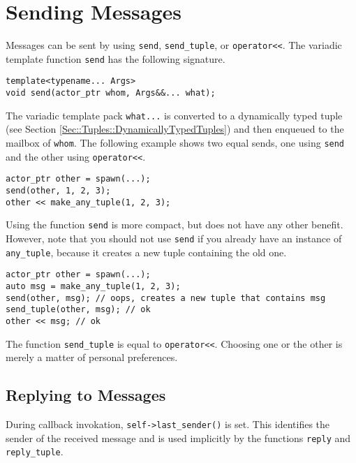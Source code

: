 \section{Sending Messages}
\label{Sec::Send}

Messages can be sent by using \lstinline^send^, \lstinline^send_tuple^, or \lstinline^operator<<^. The variadic template function \lstinline^send^ has the following signature.

\begin{lstlisting}
template<typename... Args>
void send(actor_ptr whom, Args&&... what);
\end{lstlisting}

The variadic template pack \lstinline^what...^ is converted to a dynamically typed tuple (see Section \ref{Sec::Tuples::DynamicallyTypedTuples}) and then enqueued to the mailbox of \lstinline^whom^.
The following example shows two equal sends, one using \lstinline^send^ and the other using \lstinline^operator<<^.

\begin{lstlisting}
actor_ptr other = spawn(...);
send(other, 1, 2, 3);
other << make_any_tuple(1, 2, 3);
\end{lstlisting}

Using the function \lstinline^send^ is more compact, but does not have any other benefit.
However, note that you should not use \lstinline^send^ if you already have an instance of \lstinline^any_tuple^, because it creates a new tuple containing the old one.

\begin{lstlisting}
actor_ptr other = spawn(...);
auto msg = make_any_tuple(1, 2, 3);
send(other, msg); // oops, creates a new tuple that contains msg
send_tuple(other, msg); // ok
other << msg; // ok
\end{lstlisting}

The function \lstinline^send_tuple^ is equal to \lstinline^operator<<^.
Choosing one or the other is merely a matter of personal preferences.

\clearpage
\subsection{Replying to Messages}
\label{Sec::Send::Reply}

During callback invokation, \lstinline^self->last_sender()^ is set.
This identifies the sender of the received message and is used implicitly by the functions \lstinline^reply^ and \lstinline^reply_tuple^.

